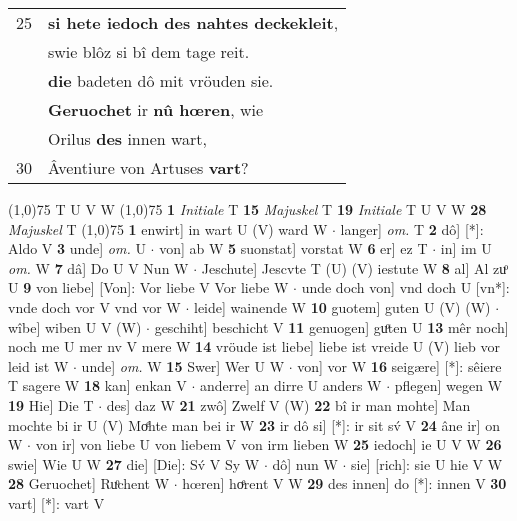 \documentclass[8pt,a4paper,notitlepage]{article}
\begin{document}
\begin{table}[ht]
\begin{minipage}[t]{0.5\linewidth}
\begin{tabular}{rl}
25 & \textbf{si hete iedoch des nahtes deckekleit},\\ 
 & swie blôz si bî dem tage reit.\\ 
 & \textbf{die} badeten dô mit vröuden sie.\\ 
 & \textbf{Geruochet} ir \textbf{nû hœren}, wie\\ 
 & Orilus \textbf{des} innen wart,\\ 
30 & Âventiure von Artuses \textbf{vart}?\\ 
\end{tabular}
\scriptsize
\line(1,0){75} \newline
T U V W \newline
\line(1,0){75} \newline
\textbf{1} \textit{Initiale} T  \textbf{15} \textit{Majuskel} T  \textbf{19} \textit{Initiale} T U V W  \textbf{28} \textit{Majuskel} T  \newline
\line(1,0){75} \newline
\textbf{1} enwirt] in wart U (V) ward W  $\cdot$ langer] \textit{om.} T \textbf{2} dô] [*]: Aldo V \textbf{3} unde] \textit{om.} U  $\cdot$ von] ab W \textbf{5} suonstat] vorstat W \textbf{6} er] ez T  $\cdot$ in] im U \textit{om.} W \textbf{7} dâ] Do U V Nun W  $\cdot$ Jeschute] Jescvte T (U) (V) iestute W \textbf{8} al] Al zuͦ U \textbf{9} von liebe] [Von]: Vor liebe V Vor liebe W  $\cdot$ unde doch von] vnd doch U [vn*]: vnde doch vor V vnd vor W  $\cdot$ leide] wainende W \textbf{10} guotem] guten U (V) (W)  $\cdot$ wîbe] wiben U V (W)  $\cdot$ geschiht] beschicht V \textbf{11} genuogen] guͦten U \textbf{13} mêr noch] noch me U mer nv V mere W \textbf{14} vröude ist liebe] liebe ist vreide U (V) lieb vor leid ist W  $\cdot$ unde] \textit{om.} W \textbf{15} Swer] Wer U W  $\cdot$ von] vor W \textbf{16} seigære] [*]: sêiere T sagere W \textbf{18} kan] enkan V  $\cdot$ anderre] an dirre U anders W  $\cdot$ pflegen] wegen W \textbf{19} Hie] Die T  $\cdot$ des] daz W \textbf{21} zwô] Zwelf V (W) \textbf{22} bî ir man mohte] Man mochte bi ir U (V) Moͤhte man bei ir W \textbf{23} ir dô si] [*]: ir sit sv́ V \textbf{24} âne ir] on W  $\cdot$ von ir] von liebe U von liebem V von irm lieben W \textbf{25} iedoch] ie U V W \textbf{26} swie] Wie U W \textbf{27} die] [Die]: Sv́ V Sy W  $\cdot$ dô] nun W  $\cdot$ sie] [rich]: sie U hie V W \textbf{28} Geruochet] Ruͦchent W  $\cdot$ hœren] hoͤrent V W \textbf{29} des innen] do [*]: innen V \textbf{30} vart] [*]: vart V \newline
\end{minipage}
\end{table}
\end{document}
